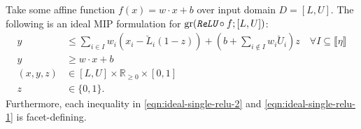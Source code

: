 \documentclass[smallextended]{svjour3}
\newcommand{\bbR}{\mathbb{R}}
\newcommand{\gr}{\operatorname{gr}}
\newcommand{\ReLu}{\texttt{ReLU}}
\begin{document}


\begin{proposition} \label{prop:ideal-relu}
    Take some affine function $f(x) = w \cdot x + b$ over input domain $D = [L,U]$. The following is an ideal MIP formulation for $\gr(\emph{\ReLu{}} \circ f; [L,U])$:
    \begin{subequations} \label{eqn:ideal-single-relu}
    \begin{align}
        y &\leq \sum_{i \in I} w_i(x_i - \breve{L}_i(1-z)) + \left(b + \sum_{i \not\in I} w_i\breve{U}_i\right)z \quad \forall I \subseteq \llbracket\eta\rrbracket \label{eqn:ideal-single-relu-2} \\
        y &\geq w \cdot x + b \label{eqn:ideal-single-relu-1} \\
        (x,y,z) &\in [L,U] \times \bbR_{\geq 0} \times [0,1] \label{eqn:ideal-single-relu-3} \\
        z &\in \{0,1\}. \label{eqn:ideal-single-relu-4}
    \end{align}
    \end{subequations}
    Furthermore, each inequality in \eqref{eqn:ideal-single-relu-2} and \eqref{eqn:ideal-single-relu-1} is facet-defining.
\end{proposition}
\end{document}
